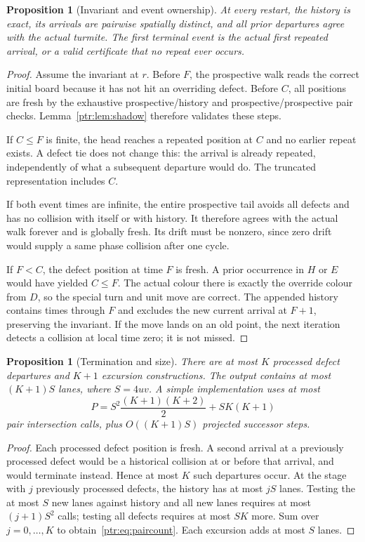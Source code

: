 \documentclass[11pt,letterpaper]{article}
\newtheorem{proposition}[theorem]{Proposition}
\theoremstyle{definition}\newtheorem{definition}[theorem]{Definition}
\theoremstyle{remark}\newtheorem{remark}[theorem]{Remark}
\begin{document}
\begin{proposition}[Invariant and event ownership]\label{ptr:prop:invariant}
At every restart, the history is exact, its arrivals are pairwise spatially distinct, and all prior departures agree with the actual turmite. The first terminal event is the actual first repeated arrival, or a valid certificate that no repeat ever occurs.
\end{proposition}
\begin{proof}
Assume the invariant at $r$. Before $F$, the prospective walk reads the correct initial board because it has not hit an overriding defect. Before $C$, all positions are fresh by the exhaustive prospective/history and prospective/prospective pair checks. Lemma~\ref{ptr:lem:shadow} therefore validates these steps.

If $C\le F$ is finite, the head reaches a repeated position at $C$ and no earlier repeat exists. A defect tie does not change this: the arrival is already repeated, independently of what a subsequent departure would do. The truncated representation includes $C$.

If both event times are infinite, the entire prospective tail avoids all defects and has no collision with itself or with history. It therefore agrees with the actual walk forever and is globally fresh. Its drift must be nonzero, since zero drift would supply a same phase collision after one cycle.

If $F<C$, the defect position at time $F$ is fresh. A prior occurrence in $H$ or $E$ would have yielded $C\le F$. The actual colour there is exactly the override colour from $D$, so the special turn and unit move are correct. The appended history contains times through $F$ and excludes the new current arrival at $F+1$, preserving the invariant. If the move lands on an old point, the next iteration detects a collision at local time zero; it is not missed.
\end{proof}

\begin{proposition}[Termination and size]\label{ptr:prop:termination}
There are at most $K$ processed defect departures and $K+1$ excursion constructions. The output contains at most $(K+1)S$ lanes, where $S=4uv$. A simple implementation uses at most
\begin{equation}\label{ptr:eq:paircount}
 P=S^2\frac{(K+1)(K+2)}2+SK(K+1)
\end{equation}
pair intersection calls, plus $O((K+1)S)$ projected successor steps.
\end{proposition}
\begin{proof}
Each processed defect position is fresh. A second arrival at a previously processed defect would be a historical collision at or before that arrival, and would terminate instead. Hence at most $K$ such departures occur. At the stage with $j$ previously processed defects, the history has at most $jS$ lanes. Testing the at most $S$ new lanes against history and all new lanes requires at most $(j+1)S^2$ calls; testing all defects requires at most $SK$ more. Sum over $j=0,\ldots,K$ to obtain~\eqref{ptr:eq:paircount}. Each excursion adds at most $S$ lanes.
\end{proof}
\end{document}

